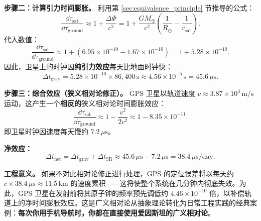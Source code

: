 \medskip

\noindent\textbf{步骤二：计算引力时间膨胀。} 利用第 \ref{sec:equivalence_principle} 节推导的公式：
\begin{equation}
    \frac{\dd \tau_{\text{sat}}}{\dd \tau_{\text{ground}}} \approx 1 + \frac{\Delta \Phi}{c^2} = 1 + \frac{GM_\oplus}{c^2}\left(\frac{1}{R_\oplus} - \frac{1}{r_{\text{sat}}}\right).
\end{equation}
代入数值：
\begin{equation}
    \frac{\dd \tau_{\text{sat}}}{\dd \tau_{\text{ground}}} \approx 1 + (6.95 \times 10^{-10} - 1.67 \times 10^{-10}) = 1 + 5.28 \times 10^{-10}.
\end{equation}
因此，卫星上的时钟因\textbf{纯引力效应}每天比地面时钟快：
\begin{equation}
    \Delta t_{\text{grav}} = 5.28 \times 10^{-10} \times 86{,}400\,\text{s} \approx 4.56 \times 10^{-5}\,\text{s} = 45.6\,\mu\text{s}.
\end{equation}

\medskip

\noindent\textbf{步骤三：综合效应（狭义相对论修正）。} GPS 卫星以轨道速度 $v \approx 3.87 \times 10^3\,\text{m/s}$ 运动，这产生一个\textbf{相反的}狭义相对论时间膨胀效应：
\begin{equation}
    \frac{\dd \tau_{\text{sat}}}{\dd \tau_{\text{ground}}} \approx 1 - \frac{v^2}{2c^2} \approx 1 - 8.35 \times 10^{-11}.
\end{equation}
即卫星时钟因速度每天慢约 $7.2\,\mu\text{s}$。

\medskip

\noindent\textbf{净效应：}
\begin{equation}
    \boxed{\Delta t_{\text{net}} = \Delta t_{\text{grav}} + \Delta t_{\text{SR}} \approx 45.6\,\mu\text{s} - 7.2\,\mu\text{s} = 38.4\,\mu\text{s}/\text{day}}.
\end{equation}

\medskip

\noindent\textbf{工程意义。} 如果不对此相对论修正进行处理，GPS 的定位误差将以每天约 $c \times 38.4\,\mu\text{s} \approx 11.5\,\text{km}$ 的速度累积——这将使整个系统在几分钟内彻底失效。为此，GPS 卫星在发射前将其原子钟的频率预先调低约 $4.46 \times 10^{-10}$ 倍，以补偿轨道上的净时间膨胀效应。这是广义相对论从抽象理论转化为日常工程实践的经典案例：\textbf{每次你用手机导航时，你都在直接使用爱因斯坦的广义相对论}。


